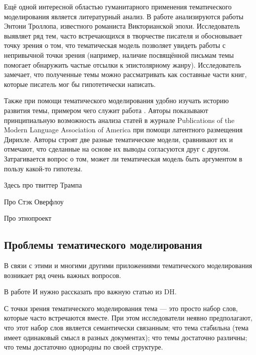 Ещё одной интересной областью гуманитарного применения тематического моделирования является литературный анализ. В работе \cite{buurma2015fictionality} анализируются работы Энтони Троллопа, известного романиста Викторианской эпохи. Исследователь выявляет ряд тем, часто встречающихся в творчестве писателя и обосновывает точку зрения о том, что тематическая модель позволяет увидеть работы с непривычной точки зрения (например, наличие посвящённой письмам темы помогает обнаружить частые отсылки к эпистолярному жанру). Исследователь замечает, что полученные темы можно рассматривать как составные части книг, которые писатель мог бы гипотетически написать.

Также при помощи тематического моделирования удобно изучать историю развития темы, примером чего служит работа \cite{goldstone2012can}. Авторы показывают принципиальную возможность анализа статей в журнале Publications of the Modern Language Association of America при помощи латентного размещения Дирихле. Авторы строят две разные тематические модели, сравнивают их и отмечают, что сделанные на основе их выводы согласуются друг с другом. Затрагивается вопрос о том, может ли тематическая модель быть аргументом в пользу какой-то гипотезы.

Здесь про твиттер Трампа \cite{wang2016catching}

Про Стэк Оверфлоу \cite{TODO_SO}

Про этнопроект \cite{TODO}

\subsection{Проблемы тематического моделирования}
В связи с этими и многими другими приложениями тематического моделирования возникает ряд очень важных вопросов.

В работе \cite{dh_sea}
И нужно рассказать про важную статью из DH.






С точки зрения тематического моделирования тема — это просто набор слов, которые часто встречаются вместе. При этом исследователи неявно предполагают, что этот набор слов является семантически связанным; что тема стабильна (тема имеет одинаковый смысл в разных документах); что темы достаточно различны; что темы достаточно однородны по своей структуре.


